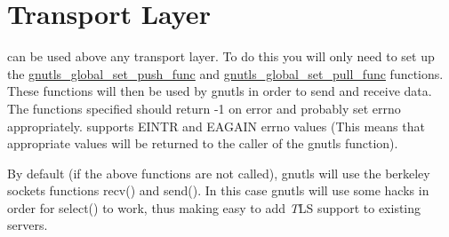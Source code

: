 \section{Transport Layer}
\par
\gnutls can be used above any transport layer. To do this you will only 
need to set up the 
\hyperref{gnutls\_global\_set\_push\_func()}{gnutls\_global\_set\_push\_func() (see Section }{
for more information)}{gnutls_global_set_push_func} and
\hyperref{gnutls\_global\_set\_pull\_func()}{gnutls\_global\_set\_pull\_func() (see Section }{
for more information)}{gnutls_global_set_pull_func}
functions. These functions will then be used by gnutls in order to send and receive data.
The functions specified should return -1 on error and probably set errno appropriately.
\gnutls supports EINTR and EAGAIN errno values (This means that appropriate
values will be returned to the caller of the gnutls function).
\par
By default (if the above functions are not called), gnutls will use
the berkeley sockets functions recv() and send(). In this case
gnutls will use some hacks in order for select() to work, thus
making easy to add {\emph TLS} support to existing servers.


